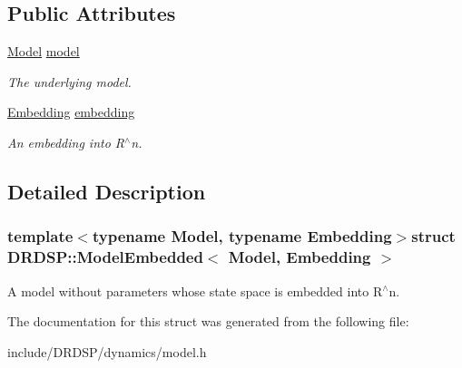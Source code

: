 \subsection*{Public Attributes}
\begin{DoxyCompactItemize}
\item 
\hypertarget{struct_d_r_d_s_p_1_1_model_embedded_a14709f8929a887ffba4b019182838fe3}{\hyperlink{struct_d_r_d_s_p_1_1_model}{Model} \hyperlink{struct_d_r_d_s_p_1_1_model_embedded_a14709f8929a887ffba4b019182838fe3}{model}}\label{struct_d_r_d_s_p_1_1_model_embedded_a14709f8929a887ffba4b019182838fe3}

\begin{DoxyCompactList}\small\item\em The underlying model. \end{DoxyCompactList}\item 
\hypertarget{struct_d_r_d_s_p_1_1_model_embedded_a5e49fc6c38129bbd5721ec97b7d19230}{\hyperlink{struct_d_r_d_s_p_1_1_embedding}{Embedding} \hyperlink{struct_d_r_d_s_p_1_1_model_embedded_a5e49fc6c38129bbd5721ec97b7d19230}{embedding}}\label{struct_d_r_d_s_p_1_1_model_embedded_a5e49fc6c38129bbd5721ec97b7d19230}

\begin{DoxyCompactList}\small\item\em An embedding into R$^\wedge$n. \end{DoxyCompactList}\end{DoxyCompactItemize}


\subsection{Detailed Description}
\subsubsection*{template$<$typename Model, typename Embedding$>$struct D\-R\-D\-S\-P\-::\-Model\-Embedded$<$ Model, Embedding $>$}

A model without parameters whose state space is embedded into R$^\wedge$n. 

The documentation for this struct was generated from the following file\-:\begin{DoxyCompactItemize}
\item 
include/\-D\-R\-D\-S\-P/dynamics/model.\-h\end{DoxyCompactItemize}
